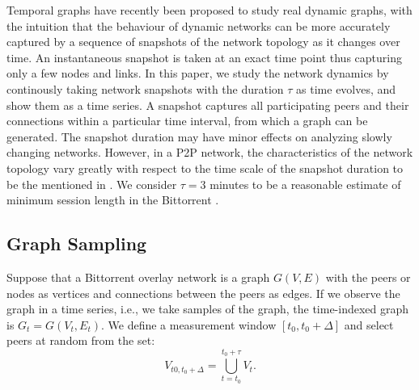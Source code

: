 \documentclass[10pt,conference,letterpaper,final]{IEEEtran}
\begin{document}
Temporal graphs have recently been proposed to study real dynamic graphs, with the intuition that the behaviour of dynamic networks can be more accurately captured by a sequence of snapshots of the network topology as it changes over time.
An instantaneous snapshot is taken at an exact time point thus capturing only a few nodes and links.
In this paper, we study the network dynamics by continously taking network snapshots with the duration $\tau$ as time evolves, and show them as a time series.
A snapshot captures all participating peers and their connections within a particular time interval, from which a graph can be generated.
The snapshot duration may have minor effects on analyzing slowly changing networks.
However, in a P2P network, the characteristics of the network topology vary greatly with respect to the time scale of the snapshot duration to be the mentioned in \cite{stutzbach2008characterizing}.
We consider $\tau=3 $ minutes to be a reasonable estimate of minimum session length in the Bittorrent \cite{stutzbach2006understanding}. 

\subsection{Graph Sampling}

Suppose that a Bittorrent overlay network is a graph $G(V,E)$ with the peers or nodes as vertices and connections between the peers as edges. 
If we observe the graph in a time series,  i.e., we take samples of the graph, the time-indexed graph is $G_t = G(V_t,E_t)$.   
We define a measurement window $[t_0,t_0 + \Delta]$ and select peers at random from the set:
 \begin{equation}
V_{t0,t_0+\Delta} = \bigcup_{t=t_0}^{t_0+\tau} V_t.
 \label{eq:samplingvertices}
 \end{equation}
\end{document}
